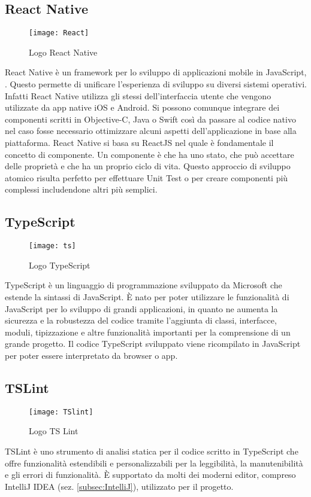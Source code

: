 \subsection{React Native}
\begin{figure}[H] 
	\centering
	\texttt{[image: React]}
	\caption{Logo React Native}
\end{figure}
React Native è un framework per lo sviluppo di applicazioni mobile in
JavaScript, . Questo permette di 
unificare l'esperienza di sviluppo su diversi sistemi operativi. Infatti React 
Native utilizza gli stessi  dell'interfaccia utente che 
vengono utilizzate da app native iOS e Android. 
Si possono comunque integrare dei componenti scritti in Objective-C,
Java o Swift così da passare al codice nativo nel caso fosse necessario
ottimizzare alcuni aspetti dell'applicazione in base alla piattaforma.
React Native si basa su ReactJS nel quale è fondamentale il concetto di
componente. Un componente è  che ha uno stato, che può accettare
delle proprietà e che ha un proprio ciclo di vita. Questo approccio di
sviluppo atomico risulta perfetto per effettuare Unit Test o per creare
componenti più complessi includendone altri più semplici.

\subsection{TypeScript}
\begin{figure}[H] 
	\centering
	\texttt{[image: ts]}
	\caption{Logo TypeScript}
\end{figure}
TypeScript è un linguaggio di programmazione sviluppato da Microsoft che
estende la sintassi di JavaScript. È nato per poter utilizzare le funzionalità
di JavaScript per lo sviluppo di grandi applicazioni, in quanto ne aumenta la
sicurezza e la robustezza del codice tramite l'aggiunta di classi,
interfacce, moduli, tipizzazione e altre funzionalità importanti per la 
comprensione di un grande progetto.
Il codice TypeScript sviluppato viene ricompilato in JavaScript per poter
essere interpretato da browser o app.

\subsection{TSLint}
\begin{figure}[H] 
	\centering
	\texttt{[image: TSlint]}
	\caption{Logo TS Lint}
\end{figure}
TSLint è uno strumento di analisi statica per il codice scritto in TypeScript che offre funzionalità estendibili e personalizzabili per la leggibilità, la manutenibilità e gli errori di funzionalità. È supportato da molti dei moderni editor, compreso IntelliJ IDEA (sez. \ref{subsec:IntelliJ}), utilizzato per il progetto.

